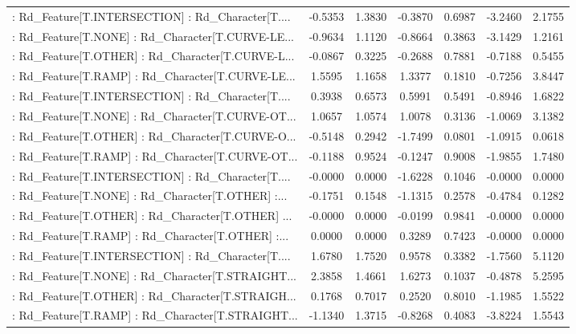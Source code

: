 \begin{longtable}{p{4cm}cccccc}
 : Rd\_Feature[T.INTERSECTION] : Rd\_Character[T.... & -0.5353 &    1.3830 & -0.3870 &       0.6987 & -3.2460 &  2.1755 \\
 : Rd\_Feature[T.NONE] : Rd\_Character[T.CURVE-LE... & -0.9634 &    1.1120 & -0.8664 &       0.3863 & -3.1429 &  1.2161 \\
 : Rd\_Feature[T.OTHER] : Rd\_Character[T.CURVE-L... & -0.0867 &    0.3225 & -0.2688 &       0.7881 & -0.7188 &  0.5455 \\
 : Rd\_Feature[T.RAMP] : Rd\_Character[T.CURVE-LE... &  1.5595 &    1.1658 &  1.3377 &       0.1810 & -0.7256 &  3.8447 \\
 : Rd\_Feature[T.INTERSECTION] : Rd\_Character[T.... &  0.3938 &    0.6573 &  0.5991 &       0.5491 & -0.8946 &  1.6822 \\
 : Rd\_Feature[T.NONE] : Rd\_Character[T.CURVE-OT... &  1.0657 &    1.0574 &  1.0078 &       0.3136 & -1.0069 &  3.1382 \\
 : Rd\_Feature[T.OTHER] : Rd\_Character[T.CURVE-O... & -0.5148 &    0.2942 & -1.7499 &       0.0801 & -1.0915 &  0.0618 \\
 : Rd\_Feature[T.RAMP] : Rd\_Character[T.CURVE-OT... & -0.1188 &    0.9524 & -0.1247 &       0.9008 & -1.9855 &  1.7480 \\
 : Rd\_Feature[T.INTERSECTION] : Rd\_Character[T.... & -0.0000 &    0.0000 & -1.6228 &       0.1046 & -0.0000 &  0.0000 \\
 : Rd\_Feature[T.NONE] : Rd\_Character[T.OTHER] :... & -0.1751 &    0.1548 & -1.1315 &       0.2578 & -0.4784 &  0.1282 \\
 : Rd\_Feature[T.OTHER] : Rd\_Character[T.OTHER] ... & -0.0000 &    0.0000 & -0.0199 &       0.9841 & -0.0000 &  0.0000 \\
 : Rd\_Feature[T.RAMP] : Rd\_Character[T.OTHER] :... &  0.0000 &    0.0000 &  0.3289 &       0.7423 & -0.0000 &  0.0000 \\
 : Rd\_Feature[T.INTERSECTION] : Rd\_Character[T.... &  1.6780 &    1.7520 &  0.9578 &       0.3382 & -1.7560 &  5.1120 \\
 : Rd\_Feature[T.NONE] : Rd\_Character[T.STRAIGHT... &  2.3858 &    1.4661 &  1.6273 &       0.1037 & -0.4878 &  5.2595 \\
 : Rd\_Feature[T.OTHER] : Rd\_Character[T.STRAIGH... &  0.1768 &    0.7017 &  0.2520 &       0.8010 & -1.1985 &  1.5522 \\
 : Rd\_Feature[T.RAMP] : Rd\_Character[T.STRAIGHT... & -1.1340 &    1.3715 & -0.8268 &       0.4083 & -3.8224 &  1.5543 \\

\end{longtable}
